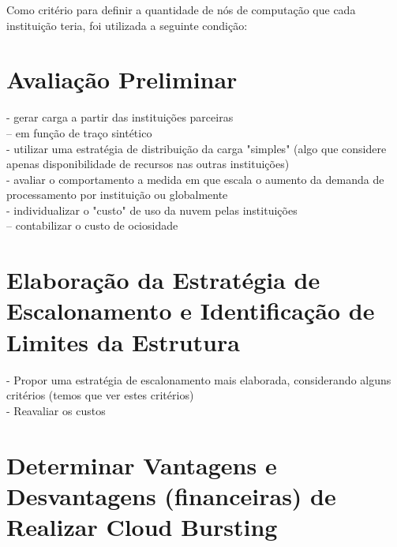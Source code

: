 \documentclass[tese,capa]{texufpel}
\begin{document}
Como critério para definir a quantidade de nós de computação que cada instituição teria, foi utilizada a seguinte condição:


\section{Avaliação Preliminar}

- gerar carga a partir das instituições parceiras\\
-- em função de traço sintético\\
- utilizar uma estratégia de distribuição da carga "simples" (algo que considere apenas disponibilidade de recursos nas outras instituições)\\
- avaliar o comportamento a medida em que escala o aumento da demanda de processamento por instituição ou globalmente\\
- individualizar o "custo" de uso da nuvem pelas instituições\\
-- contabilizar o custo de ociosidade\\

\section{Elaboração da Estratégia de Escalonamento e Identificação de Limites da Estrutura}

- Propor uma estratégia de escalonamento mais elaborada, considerando alguns critérios (temos que ver estes critérios)\\
- Reavaliar os custos\\

\section{Determinar Vantagens e Desvantagens (financeiras) de Realizar Cloud Bursting}
\end{document}
